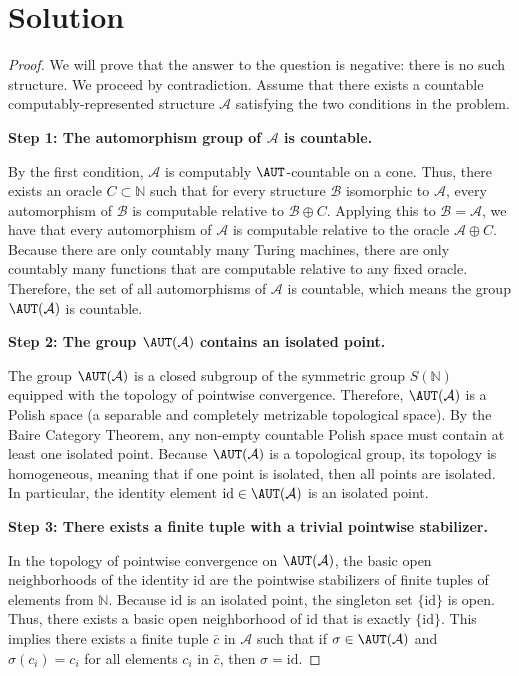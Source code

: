 \section*{Solution}

\begin{proof}
We will prove that the answer to the question is negative: there is no such structure. We proceed by contradiction. Assume that there exists a countable computably-represented structure $\mathcal{A}$ satisfying the two conditions in the problem.

\textbf{Step 1: The automorphism group of $\mathcal{A}$ is countable.}

By the first condition, $\mathcal{A}$ is computably $\AUT$-countable on a cone. Thus, there exists an oracle $C \subset \mathbb{N}$ such that for every structure $\mathcal{B}$ isomorphic to $\mathcal{A}$, every automorphism of $\mathcal{B}$ is computable relative to $\mathcal{B} \oplus C$. 
Applying this to $\mathcal{B} = \mathcal{A}$, we have that every automorphism of $\mathcal{A}$ is computable relative to the oracle $\mathcal{A} \oplus C$. Because there are only countably many Turing machines, there are only countably many functions that are computable relative to any fixed oracle. Therefore, the set of all automorphisms of $\mathcal{A}$ is countable, which means the group $\AUT(\mathcal{A})$ is countable.

\textbf{Step 2: The group $\AUT(\mathcal{A})$ contains an isolated point.}

The group $\AUT(\mathcal{A})$ is a closed subgroup of the symmetric group $S(\mathbb{N})$ equipped with the topology of pointwise convergence. Therefore, $\AUT(\mathcal{A})$ is a Polish space (a separable and completely metrizable topological space). 
By the Baire Category Theorem, any non-empty countable Polish space must contain at least one isolated point. Because $\AUT(\mathcal{A})$ is a topological group, its topology is homogeneous, meaning that if one point is isolated, then all points are isolated. In particular, the identity element $\mathrm{id} \in \AUT(\mathcal{A})$ is an isolated point.

\textbf{Step 3: There exists a finite tuple with a trivial pointwise stabilizer.}

In the topology of pointwise convergence on $\AUT(\mathcal{A})$, the basic open neighborhoods of the identity $\mathrm{id}$ are the pointwise stabilizers of finite tuples of elements from $\mathbb{N}$. 
Because $\mathrm{id}$ is an isolated point, the singleton set $\{\mathrm{id}\}$ is open. Thus, there exists a basic open neighborhood of $\mathrm{id}$ that is exactly $\{\mathrm{id}\}$. This implies there exists a finite tuple $\bar{c}$ in $\mathcal{A}$ such that if $\sigma \in \AUT(\mathcal{A})$ and $\sigma(c_i) = c_i$ for all elements $c_i$ in $\bar{c}$, then $\sigma = \mathrm{id}$.


\end{proof}
